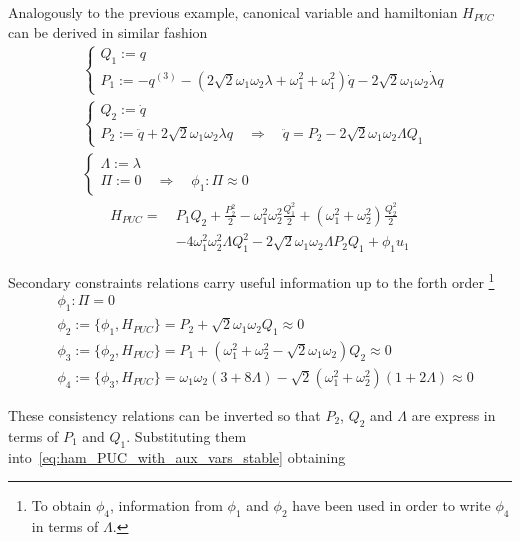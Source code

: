 Analogously to the previous example, canonical variable and hamiltonian
$H_{PUC}$ can be derived in similar fashion
\begin{align*}
  & \begin{cases}
    Q_1 := q \\
    P_1 := - q^{(3)} -
    \left( 2\sqrt{2} \omega_1\omega_2\lambda + \omega_1^2 + \omega_1^2 \right)
    \dot{q} - 2\sqrt{2}\omega_1\omega_2\dot{\lambda} q
  \end{cases} \\
  & \begin{cases}
    Q_2 := \dot{q} \\
    P_2 := \ddot{q} + 2\sqrt{2} \omega_1\omega_2\lambda q
    \quad \Rightarrow \quad
    \ddot{q} = P_2 - 2\sqrt{2} \omega_1\omega_2\Lambda Q_1
  \end{cases} \\
  & \begin{cases}
    \Lambda := \lambda \\
    \Pi := 0
    \quad  \Rightarrow \quad \phi_1: \Pi \approx 0
  \end{cases}
\end{align*}
\begin{align} \label{eq:ham_PUC_with_aux_vars_stable}
  H_{PUC} =\ & P_1 Q_2 + \frac{P_2^2}{2} -
  \omega_1^2\omega_2^2\frac{Q_1^2}{2} +
  \left( \omega_1^2 + \omega_2^2 \right) \frac{Q_2^2}{2} \\
  & - 4 \omega_1^2\omega_2^2\Lambda Q_1^2 -
  2\sqrt{2}\omega_1\omega_2\Lambda P_2 Q_1 + \phi_1 u_1
\end{align}

Secondary constraints relations carry useful information up to the forth order
\footnote{
  To obtain $\phi_4$, information from $\phi_1$ and $\phi_2$ have been used in
  order to write $\phi_4$ in terms of $\Lambda$.
}
\begin{align*}
  & \phi_1 : \Pi = 0 \\
  & \phi_2 := \{\phi_1, H_{PUC}\} =
    P_2 + \sqrt{2} \omega_1\omega_2 Q_1 \approx 0 \\
  & \phi_3 := \{\phi_2, H_{PUC}\} =
    P_1 + \left(\omega_1^2 + \omega_2^2 - \sqrt{2}\omega_1\omega_2 \right) Q_2
    \approx 0 \\
  & \phi_4 := \{\phi_3, H_{PUC}\} =
  \omega_1 \omega_2 (3+8\Lambda) - \sqrt{2}
  \left( \omega_1^2 + \omega_2^2 \right) \left(1 + 2\Lambda \right) \approx 0
\end{align*}

These consistency relations can be inverted so that $P_2$, $Q_2$ and $\Lambda$
are express in terms of $P_1$ and $Q_1$. Substituting them
into~\eqref{eq:ham_PUC_with_aux_vars_stable} obtaining

